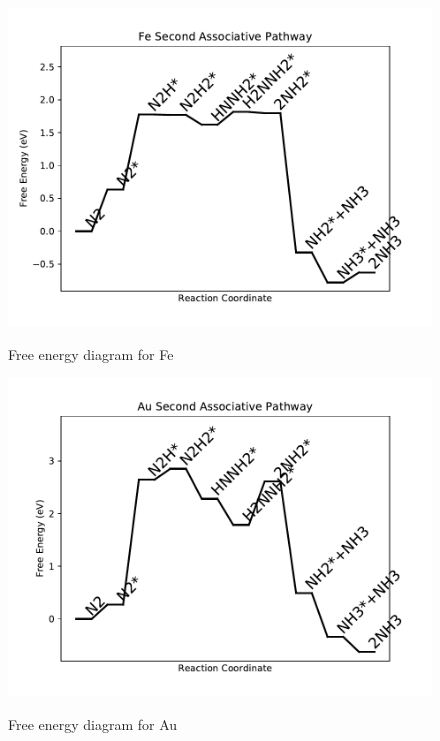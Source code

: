 \documentclass{article}
\begin{document}
\begin{figure}
\includegraphics[width=1\linewidth]{data/plots/Fe_associative_2.pdf}
\label{fig:Fe_associative_2}
\caption{Free energy diagram for Fe}
\end{figure}

\begin{figure}
\includegraphics[width=1\linewidth]{data/plots/Au_associative_2.pdf}
\label{fig:Au_associative_2}
\caption{Free energy diagram for Au}
\end{figure}
\end{document}
